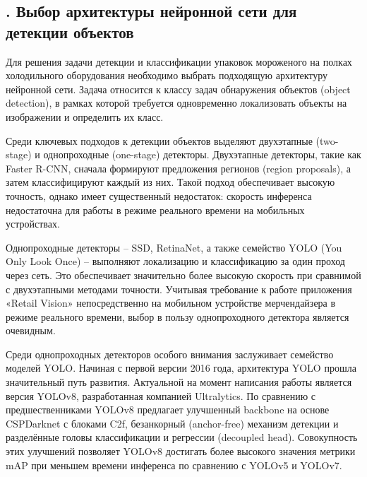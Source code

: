 \setcounter{chaptercntr}{4}


\titlespace

\subsection*{ 
  \gostTitleFont
  \redline
  \thechaptercntr .\thesubchaptercntr \spc 
  Выбор архитектуры нейронной сети для детекции объектов
} \addtocounter{subchaptercntr}{1} 

\subtitlespace

{\gostFont

  \par \redline Для решения задачи детекции и классификации упаковок мороженого на полках холодильного оборудования необходимо выбрать подходящую архитектуру нейронной сети. Задача относится к классу задач обнаружения объектов (object detection), в рамках которой требуется одновременно локализовать объекты на изображении и определить их класс.

  \par \redline Среди ключевых подходов к детекции объектов выделяют двухэтапные (two-stage) и однопроходные (one-stage) детекторы. Двухэтапные детекторы, такие как Faster R-CNN, сначала формируют предложения регионов (region proposals), а затем классифицируют каждый из них. Такой подход обеспечивает высокую точность, однако имеет существенный недостаток: скорость инференса недостаточна для работы в режиме реального времени на мобильных устройствах.

  \par \redline Однопроходные детекторы {--} SSD, RetinaNet, а также семейство YOLO (You Only Look Once) {--} выполняют локализацию и классификацию за один проход через сеть. Это обеспечивает значительно более высокую скорость при сравнимой с двухэтапными методами точности. Учитывая требование к работе приложения «Retail Vision» непосредственно на мобильном устройстве мерчендайзера в режиме реального времени, выбор в пользу однопроходного детектора является очевидным.

  \par \redline Среди однопроходных детекторов особого внимания заслуживает семейство моделей YOLO. Начиная с первой версии 2016 года, архитектура YOLO прошла значительный путь развития. Актуальной на момент написания работы является версия YOLOv8, разработанная компанией Ultralytics. По сравнению с предшественниками YOLOv8 предлагает улучшенный backbone на основе CSPDarknet с блоками C2f, безанкорный (anchor-free) механизм детекции и разделённые головы классификации и регрессии (decoupled head). Совокупность этих улучшений позволяет YOLOv8 достигать более высокого значения метрики mAP при меньшем времени инференса по сравнению с YOLOv5 и YOLOv7.

}
